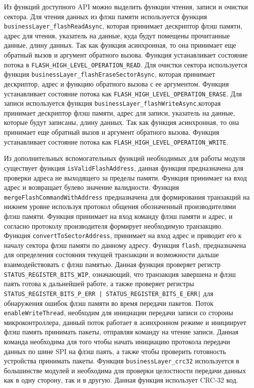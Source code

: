 Из функций доступного API можно выделить функции чтения, записи и очистки сектора.
Для чтения данных из флэш памяти используется функция \lstinline{businessLayer_flashReadAsync}, которая принимает дескриптор флэш памяти, адрес для чтения, указатель на данные,
куда будут помещены прочитанные данные, длину данных.
Так как функция асинхронная, то она принимает еще обратный вызов и аргумент обратного вызова. Функция устанавливает состояние потока в \lstinline{FLASH_HIGH_LEVEL_OPERATION_READ}.
Для очистки сектора используется функция \lstinline|businessLayer_flashEraseSectorAsync|, которая принимает дескриптор, адрес и функцию обратного вызова с ее аргументом. Функция
устанавливает состояние потока как \lstinline{FLASH_HIGH_LEVEL_OPERATION_ERASE}.
Для записи используется функция \lstinline|businessLayer_flashWriteAsync|,которая принимает дескриптор флэш памяти, адрес для записи, указатель на данные, которые будут записаны,
длину данных. Так как функция асинхронная, то она принимает еще обратный вызов и аргумент обратного вызова. Функция устанавливает состояние потока как  \lstinline{FLASH_HIGH_LEVEL_OPERATION_WRITE}.

Из дополнительных вспомогательных функций необходимых для работы модуля существует функция \lstinline|isValidFlashAddress|, данная функция предназначена для проверки
адреса не выходящего за пределы памяти. Функция принимает на вход адрес и возвращает булево значение валидности.
Функция \lstinline|mergeFlashCommandWithAddress| предназначена для формирования транзакций на нижнем уровне используя протокол общения обозначенный производителями флэш памяти.
Функция принимает на вход команду флэш памяти и адрес, и согласно протоколу производителя формирует необходимую транзакцию. 
Функция \lstinline|convertToSectorAddress|, принимает на вход адрес и приводит его к началу сектора флэш памяти по данному адресу.
Функция \lstinline|flash|, предназначена для определения состояния текущей транзакции и возможности дальше взаимодействовать с флэш памятью.
Данная функция проверяет регистр \lstinline|STATUS_REGISTER_BITS_WIP|, означающий, что транзакция завершена и флэш паять готова к дальнейшей работе, а также
проверяет регистры \lstinline{STATUS_REGISTER_BITS_P_ERR | STATUS_REGISTER_BITS_E_ERR|} для обнаружения ошибок флэш памяти во время передачи пакетов.
Поток \lstinline|enableWriteThread|, необходим для инициации передачи записи со стороны микроконтроллера, данный поток работает в асинхронном режиме и
инициирует флэш память принимать пакеты, отправляя команду на чтение записи. Данная команда необходима для того чтобы 
начать инициацию протокола передачи данных по шине SPI на флэш паять, а также чтобы проверить готовность устройства принимать пакеты.
Функция \lstinline|businessLayer_crc32| используется в большинстве модулей и необходима для проверки целостности передачи данных как в одну сторону, 
так и в другую. Данная функция использует CRC-32 код.

